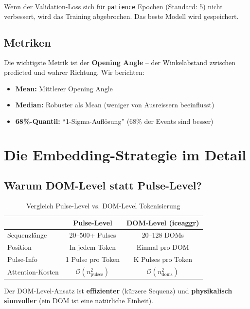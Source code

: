 \documentclass[12pt, a4paper]{article}
\begin{document}
Wenn der Validation-Loss sich f\"ur \texttt{patience} Epochen (Standard: 5)
nicht verbessert, wird das Training abgebrochen. Das beste Modell wird
gespeichert.

\subsection{Metriken}

Die wichtigste Metrik ist der \textbf{Opening Angle} -- der Winkelabstand
zwischen predicted und wahrer Richtung. Wir berichten:
\begin{itemize}
    \item \textbf{Mean:} Mittlerer Opening Angle
    \item \textbf{Median:} Robuster als Mean (weniger von Ausreissern beeinflusst)
    \item \textbf{68\%-Quantil:} ``1-Sigma-Aufl\"osung'' (68\% der Events sind besser)
\end{itemize}


\newpage
\section{Die Embedding-Strategie im Detail}

\subsection{Warum DOM-Level statt Pulse-Level?}

\begin{table}[H]
\centering
\begin{tabular}{lcc}
\toprule
& \textbf{Pulse-Level} & \textbf{DOM-Level (iceaggr)} \\
\midrule
Sequenzl\"ange & 20--500+ Pulses & 20--128 DOMs \\
Position & In jedem Token & Einmal pro DOM \\
Pulse-Info & 1 Pulse pro Token & K Pulses pro Token \\
Attention-Kosten & $\mathcal{O}(n^2_\text{pulses})$ & $\mathcal{O}(n^2_\text{doms})$ \\
\bottomrule
\end{tabular}
\caption{Vergleich Pulse-Level vs. DOM-Level Tokenisierung}
\end{table}

Der DOM-Level-Ansatz ist \textbf{effizienter} (k\"urzere Sequenz) und
\textbf{physikalisch sinnvoller} (ein DOM ist eine nat\"urliche Einheit).
\end{document}
